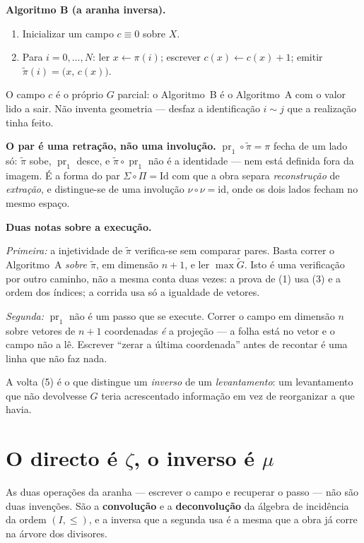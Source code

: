 \documentclass[11pt,a4paper]{article}
\begin{document}
\medskip\noindent\textbf{Algoritmo B (a aranha inversa).}
\begin{enumerate}\itemsep2pt
\item Inicializar um campo $c\equiv0$ sobre $X$.
\item Para $i=0,\dots,N$: ler $x\leftarrow\pi(i)$; escrever
$c(x)\leftarrow c(x)+1$; emitir $\tilde\pi(i)=\bigl(x,\,c(x)\bigr)$.
\end{enumerate}
O campo $c$ é o próprio $G$ parcial: o Algoritmo~B é o Algoritmo~A com o valor
lido a sair. Não inventa geometria --- desfaz a identificação $i\sim j$ que a
realização tinha feito.

\medskip\noindent\textbf{O par é uma retração, não uma involução.}
$\operatorname{pr}_1\circ\tilde\pi=\pi$ fecha de um lado só: $\tilde\pi$ sobe,
$\operatorname{pr}_1$ desce, e $\tilde\pi\circ\operatorname{pr}_1$ não é a
identidade --- nem está definida fora da imagem. É a forma do par
$\Sigma\circ\Pi=\mathrm{Id}$ com que a obra separa \emph{reconstrução} de
\emph{extração}, e distingue-se de uma involução $\nu\circ\nu=\mathrm{id}$, onde
os dois lados fecham no mesmo espaço.

\medskip\noindent\textbf{Duas notas sobre a execução.}

\emph{Primeira:} a injetividade de $\tilde\pi$ verifica-se sem comparar pares. Basta correr o Algoritmo~A \emph{sobre $\tilde\pi$}, em dimensão $n+1$, e
ler $\max\tilde G$. Isto é uma verificação por outro caminho, não a mesma conta
duas vezes: a prova de (1) usa (3) e a ordem dos índices; a corrida usa só a
igualdade de vetores.

\emph{Segunda:} $\operatorname{pr}_1$ não é um passo que se execute. Correr o
campo em dimensão $n$ sobre vetores de $n+1$ coordenadas \emph{é} a projeção --- a
folha está no vetor e o campo não a lê. Escrever ``zerar a última coordenada''
antes de recontar é uma linha que não faz nada.

A volta (5) é o que distingue um \emph{inverso} de um \emph{levantamento}: um
levantamento que não devolvesse $G$ teria acrescentado informação em vez de
reorganizar a que havia.

\section{O directo é $\zeta$, o inverso é $\mu$}\label{sec:zeta}

\noindent As duas operações da aranha --- escrever o campo e recuperar o passo
--- não são duas invenções. São a \textbf{convolução} e a \textbf{deconvolução}
da álgebra de incidência da ordem $(I,\le)$, e a inversa que a segunda usa é a
mesma que a obra já corre na árvore dos divisores.
\end{document}
